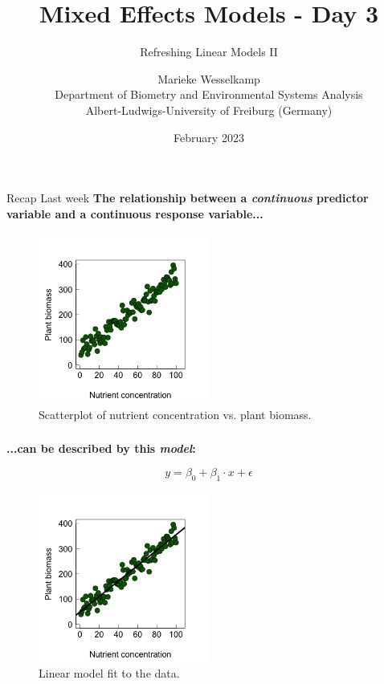 \documentclass{beamer}
\title{Mixed Effects Models - Day 3}
\subtitle{Refreshing Linear Models II}
\author{Marieke Wesselkamp \\ Department of Biometry and Environmental Systems Analysis \\ Albert-Ludwigs-University of Freiburg (Germany)}
\date{February 2023}
\begin{document}
\begin{frame}
  \titlepage
\end{frame}

\begin{frame}{Recap Last week}
  \textbf{The relationship between a \textit{continuous} predictor variable and a continuous response variable...}
  
  \begin{figure}[h]
    \centering
    \includegraphics[width=0.5\textwidth]{lectures/day_3_LM_refresh_II/figures/unnamed-chunk-2-1.png} 
    \caption{Scatterplot of nutrient concentration vs. plant biomass.}
  \end{figure}
\end{frame}

\begin{frame}
  \frametitle{}
  \textbf{...can be described by this \textit{model}:}
  
  \begin{equation*}
  y = \beta_0 + \beta_1 \cdot x + \epsilon
  \end{equation*}
  
  \begin{figure}[h]
    \centering
    \includegraphics[width=0.5\textwidth]{lectures/day_3_LM_refresh_II/figures/unnamed-chunk-3-1.png} 
    \caption{Linear model fit to the data.}
  \end{figure}
\end{frame}
\end{document}
